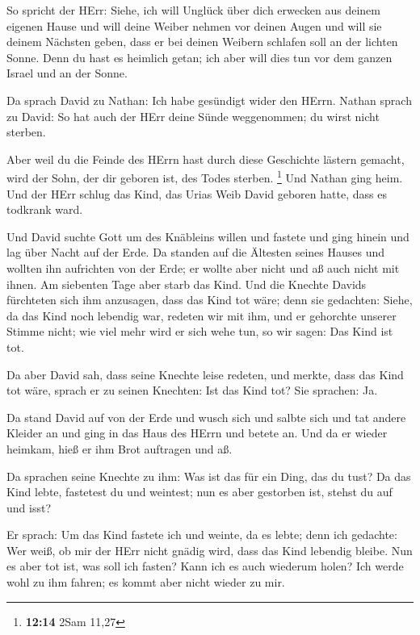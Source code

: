  So spricht der HErr: Siehe, ich will Unglück über dich
erwecken aus deinem eigenen Hause und will deine Weiber nehmen vor
deinen Augen und will sie deinem Nächsten geben, dass er bei deinen
Weibern schlafen soll an der lichten Sonne.  Denn du hast
es heimlich getan; ich aber will dies tun vor dem ganzen Israel und an
der Sonne.

 Da sprach David zu Nathan: Ich habe gesündigt wider den
HErrn. Nathan sprach zu David: So hat auch der HErr deine Sünde
weggenommen; du wirst nicht sterben.

 Aber weil du die Feinde des HErrn hast durch diese
Geschichte lästern gemacht, wird der Sohn, der dir geboren ist, des
Todes sterben. \footnote{\textbf{12:14} 2Sam 11,27}  Und
Nathan ging heim. Und der HErr schlug das Kind, das Urias Weib David
geboren hatte, dass es todkrank ward.

 Und David suchte Gott um des Knäbleins willen und fastete
und ging hinein und lag über Nacht auf der Erde.  Da
standen auf die Ältesten seines Hauses und wollten ihn aufrichten von
der Erde; er wollte aber nicht und aß auch nicht mit ihnen.
 Am siebenten Tage aber starb das Kind. Und die Knechte
Davids fürchteten sich ihm anzusagen, dass das Kind tot wäre; denn sie
gedachten: Siehe, da das Kind noch lebendig war, redeten wir mit ihm,
und er gehorchte unserer Stimme nicht; wie viel mehr wird er sich wehe
tun, so wir sagen: Das Kind ist tot.

 Da aber David sah, dass seine Knechte leise redeten, und
merkte, dass das Kind tot wäre, sprach er zu seinen Knechten: Ist das
Kind tot? Sie sprachen: Ja.

 Da stand David auf von der Erde und wusch sich und salbte
sich und tat andere Kleider an und ging in das Haus des HErrn und betete
an. Und da er wieder heimkam, hieß er ihm Brot auftragen und aß.

 Da sprachen seine Knechte zu ihm: Was ist das für ein
Ding, das du tust? Da das Kind lebte, fastetest du und weintest; nun es
aber gestorben ist, stehst du auf und isst?

 Er sprach: Um das Kind fastete ich und weinte, da es
lebte; denn ich gedachte: Wer weiß, ob mir der HErr nicht gnädig wird,
dass das Kind lebendig bleibe.  Nun es aber tot ist, was
soll ich fasten? Kann ich es auch wiederum holen? Ich werde wohl zu ihm
fahren; es kommt aber nicht wieder zu mir.

